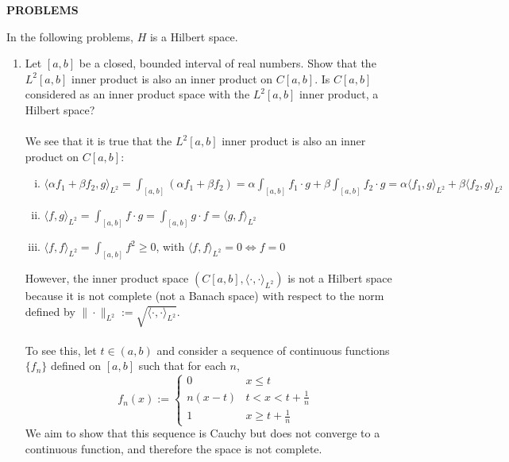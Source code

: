 \begin{center}
	\textbf{PROBLEMS}
\end{center}
In the following problems, $H$ is a Hilbert space.
\begin{enumerate}
	\setcounter{enumi}{0}
    \item Let $[a,b]$ be a closed, bounded interval of real numbers. Show that the $L^2[a,b]$ inner product is also an inner product on $C[a,b]$. Is $C[a,b]$ considered as an inner product space with the $L^2[a,b]$ inner product, a Hilbert space?\\
    \\We see that it is true that the $L^2[a,b]$ inner product is also an inner product on $C[a,b]$:
    \begin{enumerate}[(i)]
        \item 
        $
            \langle \alpha f_1+\beta f_2,g\rangle_{L^2}
            =\int_{[a,b]}( \alpha f_1+\beta f_2)
            =\alpha\int_{[a,b]} f_1\cdot g+\beta\int_{[a,b]} f_2\cdot g
            =\alpha\langle f_1,g\rangle_{L^2}+\beta\langle f_2,g\rangle_{L^2}
        $
        \item $\langle f,g\rangle_{L^2}=\int_{[a,b]}f\cdot g=\int_{[a,b]}g\cdot f=\langle g,f\rangle_{L^2}$
        \item $\langle f,f\rangle_{L^2}=\int_{[a,b]}f^2\ge0$, with $\langle f,f\rangle_{L^2}=0\iff f=0$
    \end{enumerate}
    However, the inner product space $(C[a,b],\langle\cdot,\cdot\rangle_{L^2})$ is not a Hilbert space because it is not complete (not a Banach space) with respect to the norm defined by $\|\cdot\|_{L^2}:=\sqrt{\langle\cdot,\cdot\rangle_{L^2}}$.\\
    \\To see this, let $t\in(a,b)$ and consider a sequence of continuous functions $\{f_n\}$ defined on $[a,b]$ such that for each $n$,
    \[
        f_n(x):=
        \begin{cases}
            0 &x\le t\\
            n(x-t)&t<x<t+\frac{1}{n}\\
            1 &x\ge t+\frac{1}{n}
        \end{cases}
    \]
    We aim to show that this sequence is Cauchy but does not converge to a continuous function, and therefore the space is not complete.\\

\end{enumerate}
